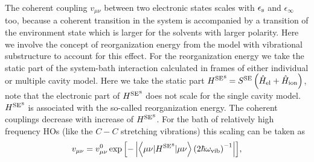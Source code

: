 \documentclass[12pt,twoside,a4paper]{report}
\begin{document}
The coherent coupling
$v_{\mu\nu}$ 
between
two electronic states 
scales with 
$\epsilon_{\rm s}$ and
$\epsilon_{\infty}$ too,  
because
a coherent transition in the system is
accompanied by a transition of the environment state
which is larger for the solvents with larger polarity.
%
%
%
%
%
Here we involve the concept of reorganization energy
from the model with vibrational substructure
to account for this effect.
For the reorganization energy we take the 
static part of the system-bath interaction
calculated in frames of either
individual or multiple cavity model.
%
%
%
Here we take the
static
part 
$
 {H
 ^{\rm SE}} 
 ^{\rm s}
            =
S^{\rm SE}
    \left(
        \hat H_{\rm el}
     +  \hat H_{\rm ion}
    \right)$,
note that the electronic part of ${H^{\rm SE}}^{\rm s}$
does not scale for the single cavity model.
 ${H^{\rm SE}}^{\rm s}$ is associated with the so-called reorganization energy.  
The coherent couplings 
decrease with increase of $ {H^{\rm SE}}^{\rm s}$.  
For the bath 
of relatively high frequency HOs 
(like the $C-C$ stretching vibrations) 
this scaling can be taken \cite{schr99} as
\begin{equation}
v_{\mu \nu}
           =   v^0_{\mu \nu}
               \exp{ \left[
                       - \left| 
                               { \left< 
                                   \mu %
                                   \nu %
                                      | 
                                         {H^{\rm SE}}^{\rm s} 
                                      | 
                                   \mu %
                                   \nu %
                                 \right>}
                                 \left(
                                     {2 \hbar \omega_{\rm vib}}   
                                 \right)^{-1}
                            \right|
                          \right] },
\label{v_scale}
\end{equation}
\end{document}
